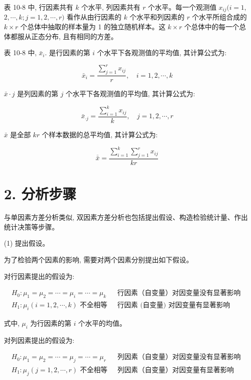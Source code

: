 \documentclass[10pt]{article}
\begin{document}
\begin{CJK*}{UTF8}{bsmi}
表 10-8 中, 行因素共有 $k$ 个水平, 列因素共有 $r$ 个水平。每一个观测值 $x_{i j}(i=1$, $2, \cdots, k ; j=1,2, \cdots, r)$ 看作从由行因素的 $k$ 个水平和列因素的 $r$ 个水平所组合成的 $k \times r$ 个总体中抽取的样本量为 1 的独立随机样本。这 $k \times r$ 个总体中的每一个总体都服从正态分布, 且有相同的方差。

表 10-8 中, $\bar{x}_{i}$. 是行因素的第 $i$ 个水平下各观测值的平均值, 其计算公式为:


\begin{equation*}
\bar{x}_{i}=\frac{\sum_{j=1}^{r} x_{i j}}{r}, \quad i=1,2, \cdots, k \tag{10.12}
\end{equation*}


$\bar{x} \cdot j$ 是列因素的第 $j$ 个水平下各观测值的平均值, 其计算公式为:


\begin{equation*}
\bar{x}_{\cdot j}=\frac{\sum_{i=1}^{k} x_{i j}}{k}, \quad j=1,2, \cdots, r \tag{10.13}
\end{equation*}


$\bar{x}$ 是全部 $k r$ 个样本数据的总平均值, 其计算公式为:


\begin{equation*}
\overline{\bar{x}}=\frac{\sum_{i=1}^{k} \sum_{j=1}^{r} x_{i j}}{k r} \tag{10.14}
\end{equation*}


\section*{2. 分析步骤}
与单因素方差分析类似, 双因素方差分析也包括提出假设、构造检验统计量、作出统计决策等步骤。

(1) 提出假设。

为了检验两个因素的影响, 需要对两个因素分别提出如下假设。

对行因素提出的假设为:

$$
\begin{array}{ll}
H_{0}: \mu_{1}=\mu_{2}=\cdots=\mu_{i}=\cdots=\mu_{k} & \text { 行因素（自变量）对因变量没有显著影响 } \\
H_{1}: \mu_{i}(i=1,2, \cdots, k) \text { 不全相等 } & \text { 行因素 (自变量) 对因变量有显著影响 }
\end{array}
$$

式中, $\mu_{i}$ 为行因素的第 $i$ 个水平的均值。

对列因素提出的假设为:

$$
\begin{array}{ll}
H_{0}: \mu_{1}=\mu_{2}=\cdots=\mu_{j}=\cdots=\mu_{r} & \text { 列因素（自变量）对因变量没有显著影响 } \\
H_{1}: \mu_{j}(j=1,2, \cdots, r) \text { 不全相等 } & \text { 列因素（自变量）对因变量有显著影响 }
\end{array}
$$


\end{CJK*}
\end{document}
